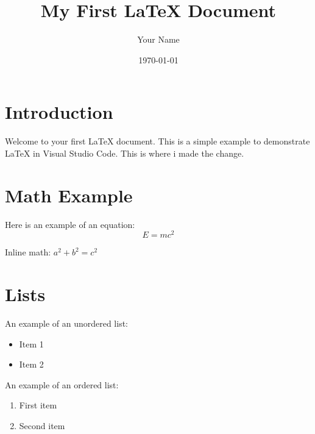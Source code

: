 \documentclass{article} %
\title{My First LaTeX Document}
\author{Your Name}
\date{\today}
\begin{document}
\maketitle

\section{Introduction}
Welcome to your first LaTeX document. This is a simple example to demonstrate LaTeX in Visual Studio Code. This is where i made the change.

\section{Math Example}
Here is an example of an equation:
\[
E = mc^2
\]

Inline math: $a^2 + b^2 = c^2$

\section{Lists}
An example of an unordered list:
\begin{itemize}
    \item Item 1
    \item Item 2
\end{itemize}

An example of an ordered list:
\begin{enumerate}
    \item First item
    \item Second item
\end{enumerate}
\end{document}
